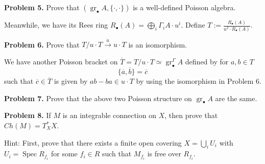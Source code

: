 \documentclass[12pt]{article}
\begin{document}
\bigskip
\noindent
\textbf{Problem 5.} Prove that $(\operatorname{gr}_\bullet A,\{\cdot,\cdot\})$ is a well-defined Poisson algebra.

\bigskip
Meanwhile, we have its Rees ring $R_\bullet(A) = \bigoplus_i \Gamma_i A\cdot u^i$. Define $T := \frac{R_\bullet(A)}{u^2\cdot R_\bullet(A)}$.

\bigskip
\noindent
\textbf{Problem 6.} Prove that $T/u\cdot T \xrightarrow{u} u\cdot T$ is an isomorphism.

\bigskip
\noindent
We have another Poisson bracket on $\overline{T} = T/u\cdot T \simeq \operatorname{gr}^\Gamma_\bullet A$ defined by for $a,b\in T$
\[
\{\overline{a},\overline{b}\} = \overline{c}
\]
such that $\overline{c} \in \overline{T}$ is given by $ab - ba \in u\cdot T$ by using the isomorphism in Problem 6.

\bigskip
\noindent
\textbf{Problem 7.} Prove that the above two Poisson structure on $\operatorname{gr}_\bullet A$ are the same.

\bigskip
\noindent
\textbf{Problem 8.} If $M$ is an integrable connection on $X$, then prove that $Ch(M)=T_X^*X$.

\bigskip
\noindent
Hint: First, prove that there exists a finite open covering $X=\bigcup_i U_i$ with $U_i=\operatorname{Spec}R_{f_i}$ for
some $f_i \in R$ such that $M_{f_i}$ is free over $R_{f_i}$.
\end{document}
